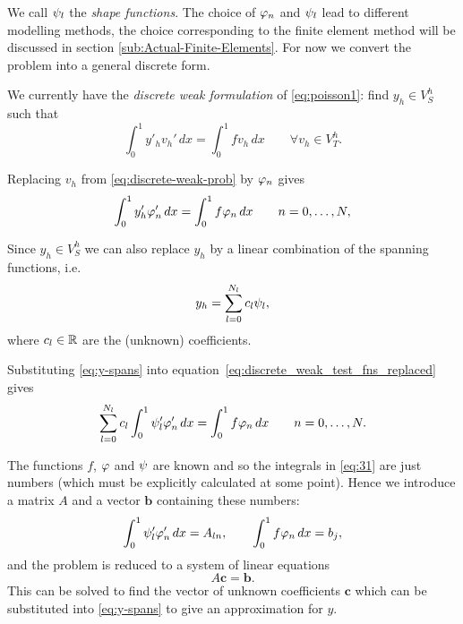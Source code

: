We call $\psi_l$ the \emph{shape functions}. The choice of $\varphi_{n}$
and $\psi_l$ lead to different modelling methods, the choice corresponding
to the finite element method will be discussed in section \ref{sub:Actual-Finite-Elements}. For now we convert the problem into a general discrete form.

We currently have the \emph{discrete weak formulation} of \eqref{eq:poisson1}: find $y_{h}\in V_{S}^{h}$ such that
\begin{equation}
  \int_{0}^{1}y'_{h}v_{h}'\, dx=\int_{0}^{1}fv_{h}\, dx\qquad\forall v_{h}\in V_{T}^{h}.
  \label{eq:discrete-weak-prob}
\end{equation}

Replacing $v_{h}$ from \eqref{eq:discrete-weak-prob} by $\varphi_{n}$
gives
\begin{equation}
  \int_{0}^{1} y'_{h} \varphi_{n}' \, dx = \int_{0}^{1}f\varphi_{n}\, dx\qquad n=0,\ldots,N,
  \label{eq:discrete_weak_test_fns_replaced}
\end{equation}

Since $y_{h}\in V_{S}^{h}$ we can also replace $y_{h}$ by a linear combination
of the spanning functions, i.e.
\begin{equation}
  y_{h}=\sum_{l=0}^{N_l}c_{l}\psi_{l},
  \label{eq:y-spans}
\end{equation}
where $c_l \in \mathbb{R}$ are the (unknown) coefficients.

Substituting \eqref{eq:y-spans} into equation~\eqref{eq:discrete_weak_test_fns_replaced} gives
\begin{equation}
  \sum_{l=0}^{N_l}c_{l}\int_{0}^{1}\psi_{l}'\varphi'_{n}\, dx=\int_{0}^{1}f\varphi_{n}\, dx
  \qquad n=0,\ldots,N.
  \label{eq:31}
\end{equation}

The functions $f$, $\varphi$ and $\psi$ are known and so the integrals in \eqref{eq:31} are just numbers (which must be explicitly calculated at some point). Hence we introduce a matrix $A$ and a vector $\mathbf{b}$ containing these numbers:
\begin{equation}
  \int_{0}^{1}\psi_{l}'\varphi'_{n}\, dx=A_{ln},\qquad\int_{0}^{1}f\varphi_{n}\, dx=b_{j},\label{eq:Aij_bj}
\end{equation}
and the problem is reduced to a system of linear equations
\begin{equation}
  A\mathbf{c} = \mathbf{b}.
  \label{eq:final_galerkin}
\end{equation}
This can be solved to find the vector of unknown coefficients $\mathbf{c}$ which can be substituted into \eqref{eq:y-spans} to give an approximation for $y$.


